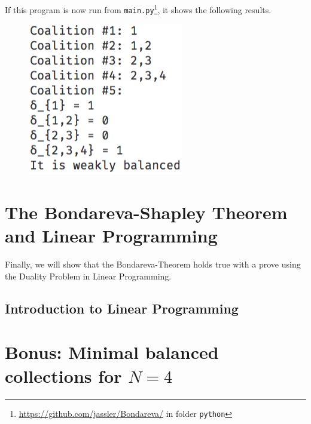 \documentclass[10pt,a4paper,titlepage]{article}
\theoremstyle{plain}
\theoremstyle{definition}
\begin{document}
If this program is now run from \texttt{main.py}\footnote{\url{https://github.com/jassler/Bondareva/} in folder \texttt{python}}, it shows the following results.

\begin{figure}[h]
    \centering
    \includegraphics[scale=0.75]{console}
\end{figure}


\pagebreak
\section{The Bondareva-Shapley Theorem and Linear Programming}\label{sec:linearprogramming}
Finally, we will show that the Bondareva-Theorem holds true with a prove using the Duality Problem in Linear Programming.

\subsection{Introduction to Linear Programming}

\pagebreak

\vspace{-30pt}

\section*{Bonus: Minimal balanced collections for $N = 4$}\vspace{-6pt}\label{bonus}
\end{document}
